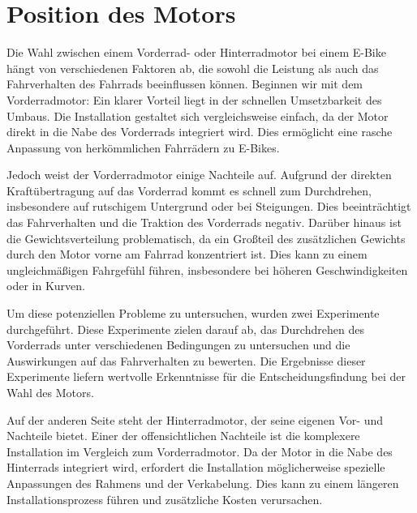 


\section{Position des Motors}
Die Wahl zwischen einem Vorderrad- oder Hinterradmotor bei einem E-Bike hängt von verschiedenen Faktoren ab, die sowohl die Leistung als auch das Fahrverhalten des Fahrrads beeinflussen können. Beginnen wir mit dem Vorderradmotor: Ein klarer Vorteil liegt in der schnellen Umsetzbarkeit des Umbaus. Die Installation gestaltet sich vergleichsweise einfach, da der Motor direkt in die Nabe des Vorderrads integriert wird. Dies ermöglicht eine rasche Anpassung von herkömmlichen Fahrrädern zu E-Bikes.

Jedoch weist der Vorderradmotor einige Nachteile auf. Aufgrund der direkten Kraftübertragung auf das Vorderrad kommt es schnell zum Durchdrehen, insbesondere auf rutschigem Untergrund oder bei Steigungen. Dies beeinträchtigt das Fahrverhalten und die Traktion des Vorderrads negativ. Darüber hinaus ist die Gewichtsverteilung problematisch, da ein Großteil des zusätzlichen Gewichts durch den Motor vorne am Fahrrad konzentriert ist. Dies kann zu einem ungleichmäßigen Fahrgefühl führen, insbesondere bei höheren Geschwindigkeiten oder in Kurven.

Um diese potenziellen Probleme zu untersuchen, wurden zwei Experimente durchgeführt. Diese Experimente zielen darauf ab, das Durchdrehen des Vorderrads unter verschiedenen Bedingungen zu untersuchen und die Auswirkungen auf das Fahrverhalten zu bewerten. Die Ergebnisse dieser Experimente liefern wertvolle Erkenntnisse für die Entscheidungsfindung bei der Wahl des Motors.

Auf der anderen Seite steht der Hinterradmotor, der seine eigenen Vor- und Nachteile bietet. Einer der offensichtlichen Nachteile ist die komplexere Installation im Vergleich zum Vorderradmotor. Da der Motor in die Nabe des Hinterrads integriert wird, erfordert die Installation möglicherweise spezielle Anpassungen des Rahmens und der Verkabelung. Dies kann zu einem längeren Installationsprozess führen und zusätzliche Kosten verursachen.

